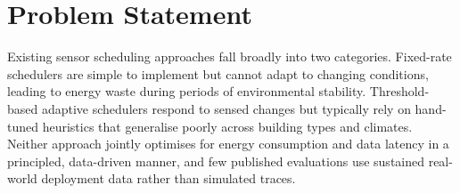 \section{Problem Statement}

Existing sensor scheduling approaches fall broadly into two categories. Fixed-rate schedulers are
simple to implement but cannot adapt to changing conditions, leading to energy waste during
periods of environmental stability. Threshold-based adaptive schedulers respond to sensed changes
but typically rely on hand-tuned heuristics that generalise poorly across building types and
climates. Neither approach jointly optimises for energy consumption and data latency in a
principled, data-driven manner, and few published evaluations use sustained real-world deployment
data rather than simulated traces.
